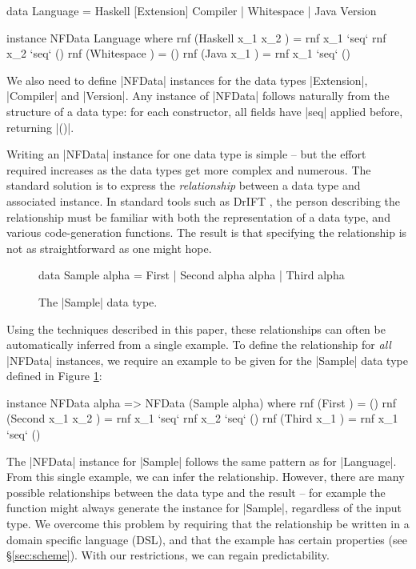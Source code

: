 \documentclass[preprint]{sigplanconf}
\begin{document}
\begin{code}
data Language  =  Haskell [Extension] Compiler
               |  Whitespace
               |  Java Version

instance NFData Language where
    rnf (Haskell x_1 x_2  ) = rnf x_1 `seq` rnf x_2 `seq` ()
    rnf (Whitespace       ) = ()
    rnf (Java x_1         ) = rnf x_1 `seq` ()
\end{code}

We also need to define |NFData| instances for the data types |Extension|, |Compiler| and |Version|. Any instance of |NFData| follows naturally from the structure of a data type: for each constructor, all fields have |seq| applied before, returning |()|.

Writing an |NFData| instance for one data type is simple -- but the effort required increases as the data types get more complex and numerous. The standard solution is to express the \textit{relationship} between a data type and associated instance. In standard tools such as DrIFT \cite{drift}, the person describing the relationship must be familiar with both the representation of a data type, and various code-generation functions. The result is that specifying the relationship is not as straightforward as one might hope.

\begin{figure}
\begin{code}
data Sample alpha  =  First
                   |  Second  alpha alpha
                   |  Third   alpha
\end{code}
\caption{The |Sample| data type.}
\label{fig:sample}
\end{figure}

Using the techniques described in this paper, these relationships can often be automatically inferred from a single example. To define the relationship for \textit{all} |NFData| instances, we require an example to be given for the |Sample| data type defined in Figure \ref{fig:sample}:

\begin{code}
instance NFData alpha => NFData (Sample alpha) where
    rnf (First           ) = ()
    rnf (Second x_1 x_2  ) = rnf x_1 `seq` rnf x_2 `seq` ()
    rnf (Third x_1       ) = rnf x_1 `seq` ()
\end{code}

The |NFData| instance for |Sample| follows the same pattern as for |Language|. From this single example, we can infer the relationship. However, there are many possible relationships between the data type and the result -- for example the function might always generate the instance for |Sample|, regardless of the input type. We overcome this problem by requiring that the relationship be written in a domain specific language (DSL), and that the example has certain properties (see \S\ref{sec:scheme}). With our restrictions, we can regain predictability.
\end{document}
